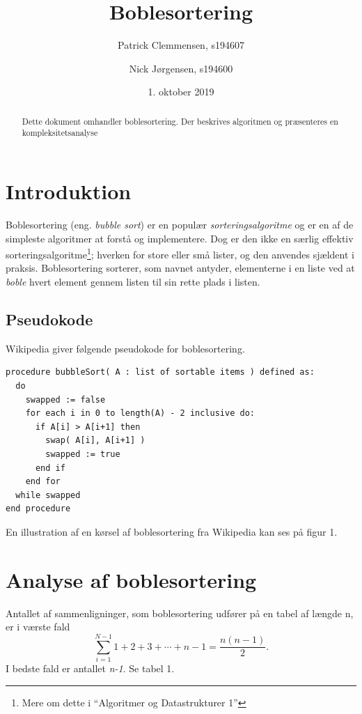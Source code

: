 \documentclass{article}
\title{\huge Boblesortering}
\author{Patrick Clemmensen, s194607 \and Nick Jørgensen, s194600}
\date{1. oktober 2019}
\begin{document}
\maketitle



\begin{abstract}
Dette dokument omhandler boblesortering. Der beskrives algoritmen og præsenteres en kompleksitetsanalyse
\end{abstract}

\section{Introduktion}
Boblesortering (eng. \textit{bubble sort}) er en populær \textit{sorteringsalgoritme} og er en af de simpleste algoritmer at forstå og implementere. Dog er den ikke en særlig effektiv sorteringsalgoritme\footnote[1]{Mere om dette i “Algoritmer og Datastrukturer 1”}; hverken for store eller små lister, og den anvendes sjældent i praksis. Boblesortering sorterer, som navnet antyder, elementerne i en liste ved at \textit{boble} hvert element gennem listen til sin rette plads i listen.

\subsection{Pseudokode}
Wikipedia {\cite{2}} giver følgende pseudokode for boblesortering.

\begin{verbatim}
procedure bubbleSort( A : list of sortable items ) defined as:
  do
    swapped := false
    for each i in 0 to length(A) - 2 inclusive do:
      if A[i] > A[i+1] then
        swap( A[i], A[i+1] )
        swapped := true
      end if
    end for
  while swapped
end procedure
\end{verbatim}
En illustration af en kørsel af boblesortering fra Wikipedia kan ses på figur 1.


\section{Analyse af boblesortering}
Antallet af sammenligninger, som boblesortering udfører på en tabel af længde n, er i værste fald
\begin{equation}
  \sum \limits_{i = 1}^{N-1} 1+2+3+\cdots+n-1 = \frac{n(n-1)}{2}.
\end{equation}
I bedste fald er antallet \textit{n-1}. Se tabel 1.
\newpage
\end{document}
